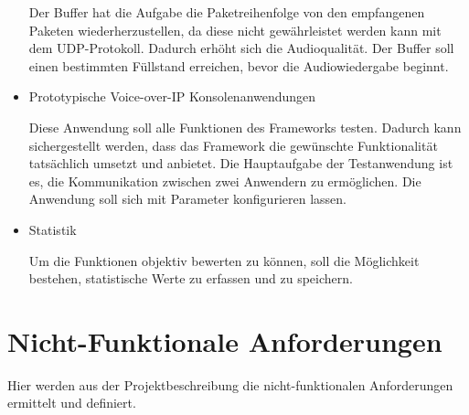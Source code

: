 \begin{itemize}
		Der Buffer hat die Aufgabe die Paketreihenfolge von den empfangenen Paketen wiederherzustellen, da diese nicht gewährleistet werden kann mit dem UDP-Protokoll. Dadurch erhöht sich die Audioqualität. Der Buffer soll einen bestimmten Füllstand erreichen, bevor die Audiowiedergabe beginnt.
				
		\item Prototypische Voice-over-IP Konsolenanwendungen

		Diese Anwendung soll alle Funktionen des Frameworks testen. Dadurch kann sichergestellt werden, dass das Framework die gewünschte Funktionalität tatsächlich umsetzt und anbietet. Die Hauptaufgabe der Testanwendung ist es, die Kommunikation zwischen zwei Anwendern zu ermöglichen. Die Anwendung soll sich mit Parameter konfigurieren lassen. 
				
		\item Statistik

		Um die Funktionen objektiv bewerten zu können, soll die Möglichkeit bestehen, statistische Werte zu erfassen und zu speichern.
		
	\end{itemize}
	
\section{Nicht-Funktionale Anforderungen}
Hier werden aus der Projektbeschreibung die nicht-funktionalen Anforderungen ermittelt und definiert.


